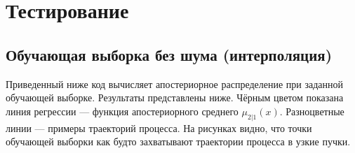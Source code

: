\documentclass[11pt,a4paper]{article}
\begin{document}


    \hypertarget{ux442ux435ux441ux442ux438ux440ux43eux432ux430ux43dux438ux435}{%
\section{Тестирование}\label{ux442ux435ux441ux442ux438ux440ux43eux432ux430ux43dux438ux435}}

    \hypertarget{ux43eux431ux443ux447ux430ux44eux449ux430ux44f-ux432ux44bux431ux43eux440ux43aux430-ux431ux435ux437-ux448ux443ux43cux430-ux438ux43dux442ux435ux440ux43fux43eux43bux44fux446ux438ux44f}{%
\subsection{Обучающая выборка без шума
(интерполяция)}\label{ux43eux431ux443ux447ux430ux44eux449ux430ux44f-ux432ux44bux431ux43eux440ux43aux430-ux431ux435ux437-ux448ux443ux43cux430-ux438ux43dux442ux435ux440ux43fux43eux43bux44fux446ux438ux44f}}

Приведенный ниже код вычисляет апостериорное распределение при заданной
обучающей выборке. Результаты представлены ниже. Чёрным цветом показана
линия регрессии --- функция апостериорного среднего \(\mu_{2|1}(x)\).
Разноцветные линии --- примеры траекторий процесса. На рисунках видно,
что точки обучающей выборки как будто захватывают траектории процесса в
узкие пучки.
\end{document}
